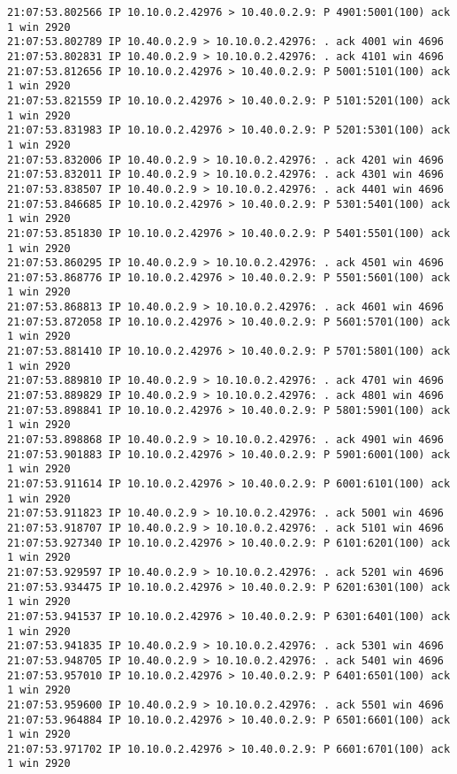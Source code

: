 \documentclass[a4paper,12pt]{article}
\begin{document}
\begin{Verbatim}
21:07:53.802566 IP 10.10.0.2.42976 > 10.40.0.2.9: P 4901:5001(100) ack 1 win 2920 
21:07:53.802789 IP 10.40.0.2.9 > 10.10.0.2.42976: . ack 4001 win 4696 
21:07:53.802831 IP 10.40.0.2.9 > 10.10.0.2.42976: . ack 4101 win 4696 
21:07:53.812656 IP 10.10.0.2.42976 > 10.40.0.2.9: P 5001:5101(100) ack 1 win 2920 
21:07:53.821559 IP 10.10.0.2.42976 > 10.40.0.2.9: P 5101:5201(100) ack 1 win 2920 
21:07:53.831983 IP 10.10.0.2.42976 > 10.40.0.2.9: P 5201:5301(100) ack 1 win 2920 
21:07:53.832006 IP 10.40.0.2.9 > 10.10.0.2.42976: . ack 4201 win 4696 
21:07:53.832011 IP 10.40.0.2.9 > 10.10.0.2.42976: . ack 4301 win 4696 
21:07:53.838507 IP 10.40.0.2.9 > 10.10.0.2.42976: . ack 4401 win 4696 
21:07:53.846685 IP 10.10.0.2.42976 > 10.40.0.2.9: P 5301:5401(100) ack 1 win 2920 
21:07:53.851830 IP 10.10.0.2.42976 > 10.40.0.2.9: P 5401:5501(100) ack 1 win 2920 
21:07:53.860295 IP 10.40.0.2.9 > 10.10.0.2.42976: . ack 4501 win 4696 
21:07:53.868776 IP 10.10.0.2.42976 > 10.40.0.2.9: P 5501:5601(100) ack 1 win 2920 
21:07:53.868813 IP 10.40.0.2.9 > 10.10.0.2.42976: . ack 4601 win 4696 
21:07:53.872058 IP 10.10.0.2.42976 > 10.40.0.2.9: P 5601:5701(100) ack 1 win 2920 
21:07:53.881410 IP 10.10.0.2.42976 > 10.40.0.2.9: P 5701:5801(100) ack 1 win 2920 
21:07:53.889810 IP 10.40.0.2.9 > 10.10.0.2.42976: . ack 4701 win 4696 
21:07:53.889829 IP 10.40.0.2.9 > 10.10.0.2.42976: . ack 4801 win 4696 
21:07:53.898841 IP 10.10.0.2.42976 > 10.40.0.2.9: P 5801:5901(100) ack 1 win 2920 
21:07:53.898868 IP 10.40.0.2.9 > 10.10.0.2.42976: . ack 4901 win 4696 
21:07:53.901883 IP 10.10.0.2.42976 > 10.40.0.2.9: P 5901:6001(100) ack 1 win 2920 
21:07:53.911614 IP 10.10.0.2.42976 > 10.40.0.2.9: P 6001:6101(100) ack 1 win 2920 
21:07:53.911823 IP 10.40.0.2.9 > 10.10.0.2.42976: . ack 5001 win 4696 
21:07:53.918707 IP 10.40.0.2.9 > 10.10.0.2.42976: . ack 5101 win 4696 
21:07:53.927340 IP 10.10.0.2.42976 > 10.40.0.2.9: P 6101:6201(100) ack 1 win 2920 
21:07:53.929597 IP 10.40.0.2.9 > 10.10.0.2.42976: . ack 5201 win 4696 
21:07:53.934475 IP 10.10.0.2.42976 > 10.40.0.2.9: P 6201:6301(100) ack 1 win 2920 
21:07:53.941537 IP 10.10.0.2.42976 > 10.40.0.2.9: P 6301:6401(100) ack 1 win 2920 
21:07:53.941835 IP 10.40.0.2.9 > 10.10.0.2.42976: . ack 5301 win 4696 
21:07:53.948705 IP 10.40.0.2.9 > 10.10.0.2.42976: . ack 5401 win 4696 
21:07:53.957010 IP 10.10.0.2.42976 > 10.40.0.2.9: P 6401:6501(100) ack 1 win 2920 
21:07:53.959600 IP 10.40.0.2.9 > 10.10.0.2.42976: . ack 5501 win 4696 
21:07:53.964884 IP 10.10.0.2.42976 > 10.40.0.2.9: P 6501:6601(100) ack 1 win 2920 
21:07:53.971702 IP 10.10.0.2.42976 > 10.40.0.2.9: P 6601:6701(100) ack 1 win 2920 

\end{Verbatim}
\end{document}
